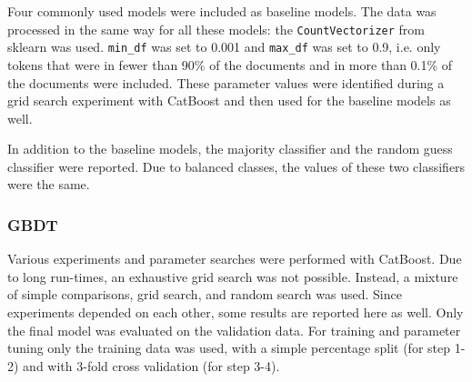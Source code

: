 \documentclass{article}
\begin{document}
	Four commonly used models were included as baseline models. The data was processed in the same way for all these models: the \lstinline{CountVectorizer} from sklearn was used. \lstinline{min_df} was set to 0.001 and \lstinline{max_df} was set to 0.9, i.e. only tokens that were in fewer than 90\% of the documents and in more than 0.1\% of the documents were included. These parameter values were identified during a grid search experiment with CatBoost and then used for the baseline models as well.
	
	In addition to the baseline models, the majority classifier and the random guess classifier were reported. Due to balanced classes, the values of these two classifiers were the same.
	
	\subsubsection{GBDT}
	
	Various experiments and parameter searches were performed with CatBoost. Due to long run-times, an exhaustive grid search was not possible. Instead, a mixture of simple comparisons, grid search, and random search was used. Since experiments depended on each other, some results are reported here as well. Only the final model was evaluated on the validation data. For training and parameter tuning only the training data was used, with a simple percentage split (for step 1-2) and with 3-fold cross validation (for step 3-4).
	
\end{document}
